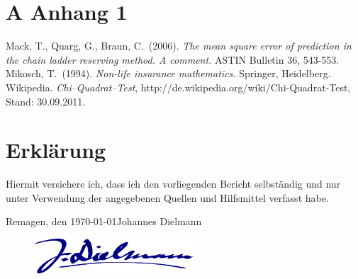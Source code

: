 \documentclass[11pt]{article}
\begin{document}
\section*{A Anhang 1}
\newpage

\begin{thebibliography}{99}
 Mack, T., Quarg, G., Braun, C.\ (2006). {\em The mean square error of prediction in the chain ladder reserving method. A comment.} ASTIN Bulletin 36, 543-553. 
 Mikosch, T.\ (1994). {\em Non-life insurance mathematics.} Springer, Heidelberg.
 Wikipedia. {\em Chi--Quadrat--Test}, http://de.wikipedia.org/wiki/Chi-Quadrat-Test, Stand: 30.09.2011.
\end{thebibliography}
\newpage

\section*{Erklärung}

\vspace{2cm}

Hiermit versichere ich, dass ich den vorliegenden Bericht selbständig und nur unter Verwendung der angegebenen Quellen und Hilfsmittel verfasst habe.

\vspace{2cm}

Remagen, den \today \hfill {Johannes Dielmann} 
\begin{figure}[hp]
	\hfill
	\includegraphics[height = 13mm]{Unterschrift.png}
\end{figure}
\end{document}
